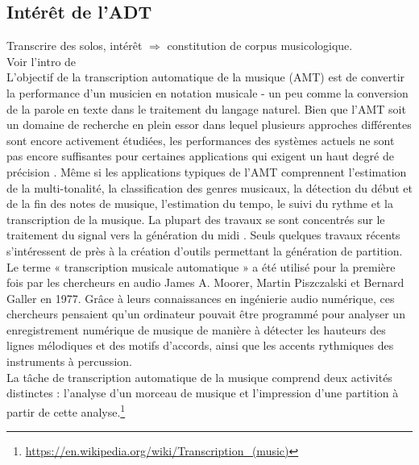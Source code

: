 \subsection{Intérêt de l’ADT}
Transcrire des solos, intérêt $\Rightarrow$ constitution de corpus musicologique.\\
Voir l’intro de \cite{article1}\\
L'objectif de la transcription automatique de la musique (AMT) \cite{article1} est de convertir la performance d'un musicien en notation musicale - un peu comme la conversion de la parole en texte dans le traitement du langage naturel. Bien que l’AMT soit un domaine de recherche en plein essor dans lequel plusieurs approches différentes sont encore activement étudiées, les performances des systèmes actuels ne sont pas encore suffisantes pour certaines applications qui exigent un haut degré de précision \cite{article1}. Même si les applications typiques de l'AMT comprennent l'estimation de la multi-tonalité, la classification des genres musicaux, la détection du début et de la fin des notes de musique, l'estimation du tempo, le suivi du rythme et la transcription de la musique. La plupart des travaux se sont concentrés sur le traitement du signal vers la génération du midi \cite{article2}. Seuls quelques travaux récents \cite{foscarin:hal-01988990} s’intéressent de près à la création d’outils permettant la génération de partition.
Le terme « transcription musicale automatique » a été utilisé pour la première fois par les chercheurs en audio James A. Moorer, Martin Piszczalski et Bernard Galler en 1977. Grâce à leurs connaissances en ingénierie audio numérique, ces chercheurs pensaient qu'un ordinateur pouvait être programmé pour analyser un enregistrement numérique de musique de manière à détecter les hauteurs des lignes mélodiques et des motifs d'accords, ainsi que les accents rythmiques des instruments à percussion.\\La tâche de transcription automatique de la musique comprend deux activités distinctes : l'analyse d'un morceau de musique et l'impression d'une partition à partir de cette analyse.\footnote{\url{https://en.wikipedia.org/wiki/Transcription_(music)}}
